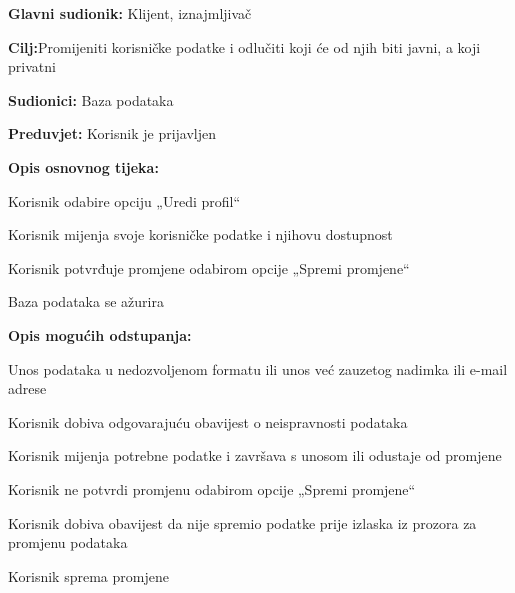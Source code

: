 						\begin{packed_item}
							
							\item \textbf{Glavni sudionik: }Klijent, iznajmljivač
							\item  \textbf{Cilj:}Promijeniti korisničke podatke i odlučiti koji će od njih biti javni, a koji privatni
							\item  \textbf{Sudionici:} Baza podataka
							\item  \textbf{Preduvjet:} Korisnik je prijavljen
							\item  \textbf{Opis osnovnog tijeka:}
							
							\item[] \begin{packed_enum}
								
								\item Korisnik odabire opciju „Uredi profil“  
								\item Korisnik mijenja svoje korisničke podatke i njihovu dostupnost 
								\item Korisnik potvrđuje promjene odabirom opcije „Spremi promjene“ 
								\item Baza podataka se ažurira 
								
								
							\end{packed_enum}
							
							\item  \textbf{Opis mogućih odstupanja:}
							
							\item[] \begin{packed_item}
								
								\item[2.a] Unos podataka u nedozvoljenom formatu ili unos već zauzetog nadimka ili e-mail adrese 
								\item[] \begin{packed_enum}
									
									\item Korisnik dobiva odgovarajuću obavijest o neispravnosti podataka 
									\item Korisnik mijenja potrebne podatke i završava s unosom ili odustaje od promjene 
									
								\end{packed_enum}
								\item[3.a] Korisnik ne potvrdi promjenu odabirom opcije „Spremi promjene“    
								\item[] \begin{packed_enum}
									
									\item Korisnik dobiva obavijest da nije spremio podatke prije izlaska iz prozora za promjenu podataka   
									\item Korisnik sprema promjene 
									
								\end{packed_enum}
								
								
								
							\end{packed_item}
						\end{packed_item}
